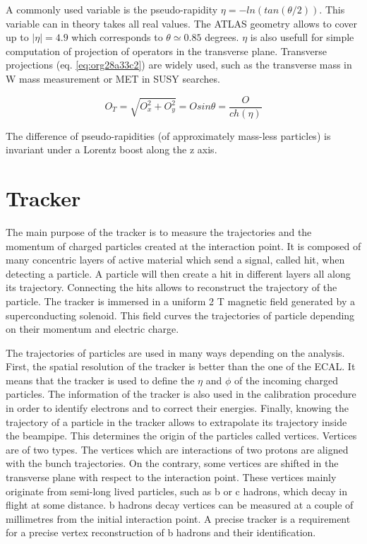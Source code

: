 A commonly used variable is the pseudo-rapidity \(\eta=-ln(tan(\theta/2))\).
This variable can in theory takes all real values.
The ATLAS geometry allows to cover up to \(|\eta|=4.9\) which corresponds to \(\theta\simeq0.85\) degrees.
$\eta$ is also usefull for simple computation of projection of operators in the transverse plane.
Transverse projections (eq. \ref{eq:org28a33c2}) are widely used, such as the transverse mass in W mass measurement or MET in SUSY searches.

\begin{equation}
\label{eq:org28a33c2}
O_T = \sqrt{O_x^2+O^2_y} = Osin\theta = \frac{O}{ch(\eta)}
\end{equation}

The difference of pseudo-rapidities (of approximately mass-less particles) is invariant under a Lorentz boost along the z axis.

\section{Tracker}
\label{sec:org62e1a18}

\label{sec:Detector_tracker}
The main purpose of the tracker is to measure the trajectories and the momentum of charged particles created at the interaction point.
It is composed of many concentric layers of active material which send a signal, called hit, when detecting a particle.
A particle will then create a hit in different layers all along its trajectory.
Connecting the hits allows to reconstruct the trajectory of the particle.
The tracker is immersed in  a uniform 2 T magnetic field generated by a superconducting solenoid.
This field curves the trajectories of particle depending on their momentum and electric charge.

The trajectories of particles are used in many ways depending on the analysis.
First, the spatial resolution of the tracker is better than the one of the ECAL.
It means that the tracker is used to define the $\eta$ and $\phi$ of the incoming charged particles.
The information of the tracker is also used in the calibration procedure in order to identify electrons and to correct their energies.
Finally, knowing the trajectory of a particle in the tracker allows to extrapolate its trajectory inside the beampipe.
This determines the origin of the particles called vertices.
Vertices are of two types.
The vertices which are interactions of two protons are aligned with the bunch trajectories.
On the contrary, some vertices are shifted in the transverse plane with respect to the interaction point.
These vertices mainly originate from semi-long lived particles, such as b or c hadrons, which decay in flight at some distance.
b hadrons decay vertices can be measured at a couple of millimetres from the initial interaction point.
A precise tracker is a requirement for a precise vertex reconstruction of b hadrons and their identification.

